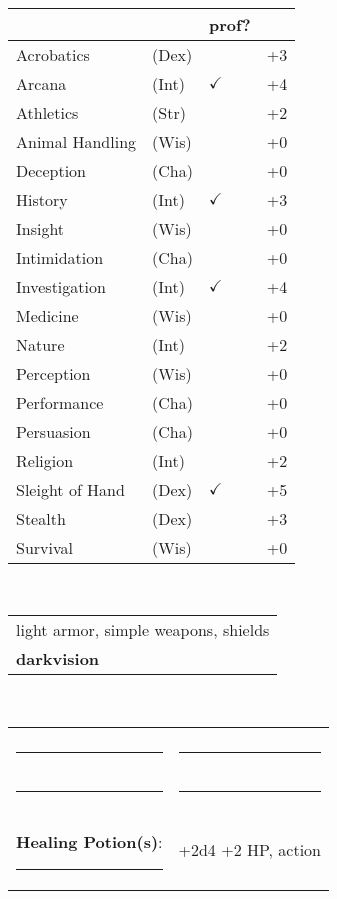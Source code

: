 \documentclass[twocolumn]{article}
\begin{document}
\\
\noindent\begin{tabular}{llll}
 & & prof? & \\
\hline
Acrobatics & (Dex) &  & +3 \\
Arcana & (Int) & $\checkmark$ & +4 \\ 
Athletics & (Str) &  & +2\\
Animal Handling & (Wis) &  & +0\\
Deception & (Cha) &  & +0\\
History & (Int) & $\checkmark$ & +3 \\
Insight & (Wis) &  & +0 \\
Intimidation & (Cha) &  & +0 \\
Investigation & (Int) & $\checkmark$ & +4 \\
Medicine & (Wis) &  & +0 \\
Nature & (Int) &  & +2 \\
Perception & (Wis) &  & +0 \\
Performance & (Cha) &  & +0 \\
Persuasion & (Cha) &  & +0 \\
Religion & (Int) &  & +2 \\
Sleight of Hand & (Dex) & $\checkmark$ & +5 \\
Stealth & (Dex) &  & +3 \\
Survival & (Wis) &  & +0 \\
\hline
\end{tabular}
\vspace{12pt}

\\
\noindent\begin{tabular}{|m{3.1in}|}
\hline
light armor, simple weapons, shields \\
\textbf{darkvision} \\
\hline
\end{tabular}
\vspace{12pt}


\\
\noindent\begin{tabular}{|ll|}
\hline&\\
\rule{1.4in}{.2pt}&\rule{1.4in}{.2pt}\\
\rule{1.4in}{.2pt}&\rule{1.4in}{.2pt}\\
\textbf{Healing Potion(s)}: \rule{.2in}{.2pt}& +2d4 +2 HP, {\sc action}\\
\hline
\end{tabular}
\vspace{12pt}
\end{document}

